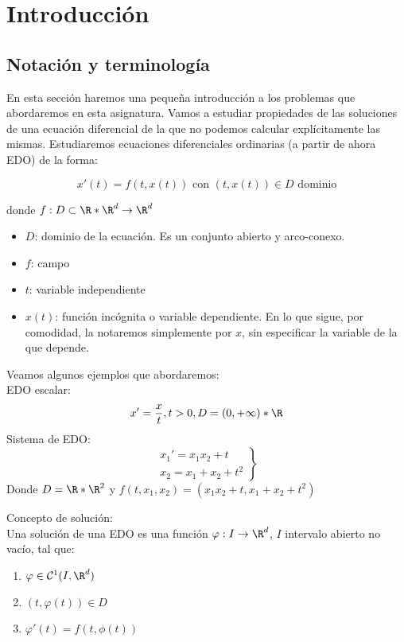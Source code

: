 \documentclass{article}
\begin{document}
\maketitle

\section{Introducción}

\subsection{Notación y terminología}

En esta sección haremos una pequeña introducción a los problemas que abordaremos
en esta asignatura. Vamos a estudiar propiedades de las soluciones de una ecuación
diferencial de la que no podemos calcular explícitamente las mismas. Estudiaremos
ecuaciones diferenciales ordinarias (a partir de ahora EDO) de la forma:

$$ x'(t) = f(t,x(t)) \text{ con } (t,x(t)) \in D \text{ dominio} $$

donde $f: D \subset \R*\R^d \to \R^d$
\begin{itemize}
    \item $D$: dominio de la ecuación. Es un conjunto abierto y arco-conexo.
    \item $f$: campo
    \item $t$: variable independiente
    \item $x(t)$: función incógnita o variable dependiente. En lo que sigue, por
    comodidad, la notaremos simplemente por $x$, sin especificar la variable de la
    que depende.
\end{itemize}

\begin{ex} Veamos algunos ejemplos que abordaremos:\\
    EDO escalar:
    $$ x' = \frac{x}{t}, t > 0, D = (0, +\infty)* \R$$
    Sistema de EDO:
    \[
    \left.
    \begin{array}{r}
        x_1' = x_1x_2 + t \\
        x_2 = x_1 + x_2 + t^2
    \end{array}
    \right\}
    \]
    Donde $D = \R * \R^2$ y $f(t, x_1, x_2) = (x_1x_2 + t, x_1 + x_2 + t^2)$
\end{ex}

\begin{definition} Concepto de solución:\\
    Una solución de una EDO es una función $\varphi: I \to \R^d$, $I$ intervalo
    abierto no vacío, tal que:
    \begin{enumerate}
        \item $\varphi \in \mathcal{C}^1(I, \R^d)$
        \item $(t, \varphi(t)) \in D$
        \item $\varphi'(t) = f(t, \phi(t))$
    \end{enumerate}

\end{definition}
\end{document}
